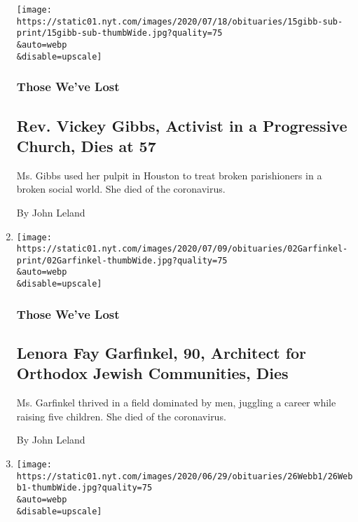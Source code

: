 \begin{enumerate}
  \texttt{[image: https://static01.nyt.com/images/2020/07/18/obituaries/15gibb-sub-print/15gibb-sub-thumbWide.jpg?quality=75\\\&auto=webp\\\&disable=upscale]}

  \hypertarget{those-weve-lost-3}{%
  \subsubsection{Those We've Lost}\label{those-weve-lost-3}}

  \hypertarget{rev-vickey-gibbs-activist-in-a-progressive-church-dies-at-57}{%
  \subsection{Rev. Vickey Gibbs, Activist in a Progressive Church, Dies
  at
  57}\label{rev-vickey-gibbs-activist-in-a-progressive-church-dies-at-57}}

  Ms. Gibbs used her pulpit in Houston to treat broken parishioners in a
  broken social world. She died of the coronavirus.

  By John Leland
\item
  \href{/2020/07/03/obituaries/lenora-garfinkel-dead-coronavirus.html}{}

  \texttt{[image: https://static01.nyt.com/images/2020/07/09/obituaries/02Garfinkel-print/02Garfinkel-thumbWide.jpg?quality=75\\\&auto=webp\\\&disable=upscale]}

  \hypertarget{those-weve-lost-4}{%
  \subsubsection{Those We've Lost}\label{those-weve-lost-4}}

  \hypertarget{lenora-fay-garfinkel-90-architect-for-orthodox-jewish-communities-dies}{%
  \subsection{Lenora Fay Garfinkel, 90, Architect for Orthodox Jewish
  Communities,
  Dies}\label{lenora-fay-garfinkel-90-architect-for-orthodox-jewish-communities-dies}}

  Ms. Garfinkel thrived in a field dominated by men, juggling a career
  while raising five children. She died of the coronavirus.

  By John Leland
\item
  \href{/2020/06/28/books/charles-webb-dead.html}{}

  \texttt{[image: https://static01.nyt.com/images/2020/06/29/obituaries/26Webb1/26Webb1-thumbWide.jpg?quality=75\\\&auto=webp\\\&disable=upscale]}


\end{enumerate}
